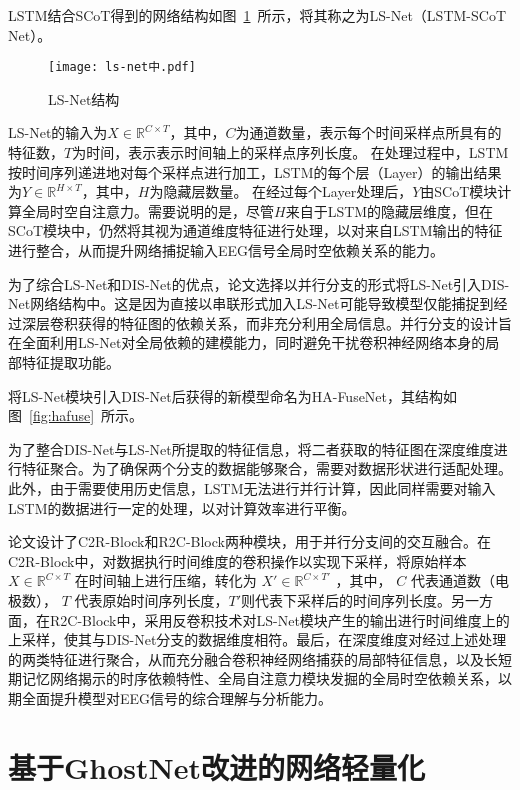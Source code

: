LSTM结合SCoT得到的网络结构如图~\ref{fig:ls}~所示，将其称之为LS-Net（LSTM-SCoT Net）。
\begin{figure}[ht]
    \centering
    \texttt{[image: ls-net中.pdf]}
    \caption{LS-Net结构}
    \label{fig:ls}
\end{figure}

LS-Net的输入为\(X \in \mathbb{R}^{C \times T}\)，其中，\(C\)为通道数量，表示每个时间采样点所具有的特征数，\(T\)为时间，表示表示时间轴上的采样点序列长度。
在处理过程中，LSTM按时间序列递进地对每个采样点进行加工，LSTM的每个层（Layer）的输出结果为\(Y \in \mathbb{R}^{H \times T}\)，其中，\(H\)为隐藏层数量。
在经过每个Layer处理后，\(Y\)由SCoT模块计算全局时空自注意力。需要说明的是，尽管\(H\)来自于LSTM的隐藏层维度，但在SCoT模块中，仍然将其视为通道维度特征进行处理，以对来自LSTM输出的特征进行整合，从而提升网络捕捉输入EEG信号全局时空依赖关系的能力。

为了综合LS-Net和DIS-Net的优点，论文选择以并行分支的形式将LS-Net引入DIS-Net网络结构中。这是因为直接以串联形式加入LS-Net可能导致模型仅能捕捉到经过深层卷积获得的特征图的依赖关系，而非充分利用全局信息。并行分支的设计旨在全面利用LS-Net对全局依赖的建模能力，同时避免干扰卷积神经网络本身的局部特征提取功能。

将LS-Net模块引入DIS-Net后获得的新模型命名为HA-FuseNet，其结构如图~\ref{fig:hafuse}~所示。

为了整合DIS-Net与LS-Net所提取的特征信息，将二者获取的特征图在深度维度进行特征聚合。为了确保两个分支的数据能够聚合，需要对数据形状进行适配处理。此外，由于需要使用历史信息，LSTM无法进行并行计算，因此同样需要对输入LSTM的数据进行一定的处理，以对计算效率进行平衡。

论文设计了C2R-Block和R2C-Block两种模块，用于并行分支间的交互融合。在C2R-Block中，对数据执行时间维度的卷积操作以实现下采样，将原始样本 \(X \in \mathbb{R}^{C \times T}\) 在时间轴上进行压缩，转化为 \(X' \in \mathbb{R}^{C \times T'}\) ，其中， \(C\) 代表通道数（电极数）， \(T\) 代表原始时间序列长度，\(T'\)则代表下采样后的时间序列长度。另一方面，在R2C-Block中，采用反卷积技术对LS-Net模块产生的输出进行时间维度上的上采样，使其与DIS-Net分支的数据维度相符。最后，在深度维度对经过上述处理的两类特征进行聚合，从而充分融合卷积神经网络捕获的局部特征信息，以及长短期记忆网络揭示的时序依赖特性、全局自注意力模块发掘的全局时空依赖关系，以期全面提升模型对EEG信号的综合理解与分析能力。

\section{基于GhostNet改进的网络轻量化}

